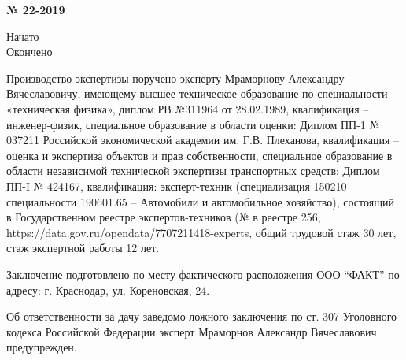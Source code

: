\noindent \textbf{№ 22-2019}\hfill           \textbf{\dataend}\\%

\noindent\parbox[l][16mm]{16.5cm}
{\def\hrf#1{\hbox to#1{\hrulefill}}
	\noindent Начато\hfill            \datastart\\%
	Окончено\hfill                \dataend\\%
}
\relax



Производство экспертизы поручено эксперту   Мраморнову Александру Вячеславовичу, имеющему высшее техническое образование по специальности «техническая физика», диплом РВ №311964 от 28.02.1989, квалификация -- инженер-физик, специальное образование в области оценки: Диплом ПП-1 № 037211 Российской экономической академии им. Г.В. Плеханова, квалификация -- оценка и экспертиза объектов и прав собственности, специальное образование в области независимой технической экспертизы транспортных средств: Диплом ПП-I № 424167, квалификация: эксперт-техник (специализация 150210 специальности 190601.65 – Автомобили и автомобильное хозяйство), состоящий в Государственном реестре экспертов-техников (№ в реестре 256, https://data.gov.ru/opendata/7707211418-experts,  общий трудовой  стаж 30 лет, стаж  экспертной работы  12 лет.

Заключение подготовлено по месту фактического расположения ООО \enquote{ФАКТ} по адресу: г. Краснодар, ул. Кореновская, 24.

Об ответственности за дачу заведомо ложного заключения по ст. 307 Уголовного кодекса Российской Федерации эксперт Мраморнов Александр Вячеславович предупрежден.
% 
% 